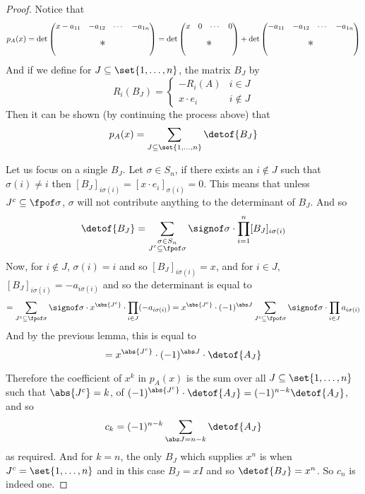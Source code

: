 \begin{proof}

    Notice that
    \[ p_A(x) = \det\pmat{\begin{matrix}x-a_{11} & -a_{12} & \cdots & -a_{1n}\end{matrix} \\[10pt] \scalebox{1.5}{$*$}\\[10pt]} =
    \det\pmat{\begin{matrix}x & 0 & \cdots & 0\end{matrix}\\[10pt] \scalebox{1.5}{$*$}\\[10pt]} +
    \det\pmat{\begin{matrix}-a_{11} & -a_{12} & \cdots & -a_{1n}\end{matrix} \\[10pt] \scalebox{1.5}{$*$}\\[10pt]} \]
    And if we define for $J\subseteq\set{1,\dots,n}$, the matrix $B_J$ by
    \[ R_i(B_J) = \begin{cases} -R_i(A) & i\in J \\ x\cdot e_i & i\notin J \end{cases} \]
    Then it can be shown (by continuing the process above) that
    \[ p_A(x) = \sum_{J\subseteq\set{1,\dots,n}}\detof{B_J} \]

    Let us focus on a single $B_J$.
    Let $\sigma\in S_n$, if there exists an $i\notin J$ such that $\sigma(i)\neq i$ then $[B_J]_{i\sigma(i)}=[x\cdot e_i]_{\sigma(i)}=0$.
    This means that unless $J^c\subseteq\fpof\sigma$, $\sigma$ will not contribute anything to the determinant of $B_J$.
    And so
    \[ \detof{B_J} = \sum_{\substack{\sigma\in S_n\\J^c\subseteq\fpof\sigma}}\signof\sigma\cdot\prod_{i=1}^n[B_J]_{i\sigma(i)} \]
    Now, for $i\notin J$, $\sigma(i)=i$ and so $[B_J]_{i\sigma(i)}=x$, and for $i\in J$, $[B_J]_{i\sigma(i)}=-a_{i\sigma(i)}$ and so the determinant is equal to
    \[ = \sum_{J^c\subseteq\fpof\sigma}\signof\sigma\cdot x^{\abs{J^c}}\cdot\prod_{i\in J}(-a_{i\sigma(i)}) =
    x^{\abs{J^c}}\cdot(-1)^{\abs J}\sum_{J^c\subseteq\fpof\sigma}\signof\sigma\cdot\prod_{i\in J}a_{i\sigma(i)} \]
    And by the previous lemma, this is equal to
    \[ = x^{\abs{J^c}}\cdot(-1)^{\abs J}\cdot\detof{A_J} \]

    Therefore the coefficient of $x^k$ in $p_A(x)$ is the sum over all $J\subseteq\set{1,\dots,n}$ such that $\abs{J^c}=k$, of $(-1)^{\abs{J^c}}\cdot\detof{A_J}=(-1)^{n-k}\detof{A_J}$, and so
    \[ c_k = (-1)^{n-k}\sum_{\abs J=n-k}\detof{A_J} \]
    as required.
    And for $k=n$, the only $B_J$ which supplies $x^n$ is when $J^c=\set{1,\dots,n}$ and in this case $B_J=xI$ and so $\detof{B_J}=x^n$.
    So $c_n$ is indeed one.


\end{proof}
